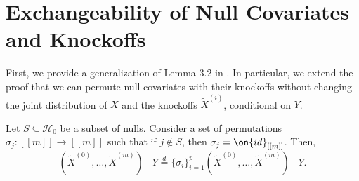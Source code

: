 \section{Exchangeability of Null Covariates and Knockoffs}
First, we provide a generalization of Lemma 3.2 in \cite{panning}. In particular, we extend the proof that we can permute null covariates with their knockoffs without changing the joint distribution of $X$ and the knockoffs $\tilde{X}^{(i)}$, conditional on $Y$.
\begin{lem}
\label{lemma2.3}
Let $S \subseteq \mathcal{H}_0$ be a subset of nulls. Consider a set of permutations $\sigma_j : [[ m ]] \to [[ m ]]$ such that if $j \not \in S$, then $\sigma_j = \on{id}_{[[ m ]]}$. Then,
\[(\tilde{X}^{(0)}, \ldots, \tilde{X}^{(m)}) \mid Y \overset{d}= \{ \sigma_i \}_{i=1}^p \left( \tilde{X}^{(0)}, \ldots, \tilde{X}^{(m)} \right) \mid Y. \]
\end{lem}

